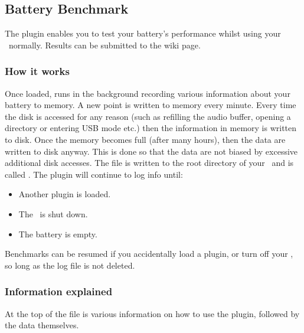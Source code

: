 \subsection{Battery Benchmark}
The  plugin enables you to test your battery's
performance whilst using your \dap\ normally. Results can be submitted 
to the  wiki page.

\subsubsection{How it works}
Once loaded,  runs in the
background recording various information about your battery to memory.
A new point is written to memory every minute.
Every time the disk is accessed for any reason
(such as refilling the audio buffer, opening a directory or entering
USB mode etc.) then the information in memory is written to disk.
Once the memory becomes full (after many hours), then the data
are written to disk anyway. This is done so that the data are not biased by
excessive additional disk accesses. The file is written to the root
directory of your \dap\ and is called .
The plugin will continue to log info until:

\begin{itemize}
\item Another plugin is loaded.
\item The \dap\ is shut down.
\item The battery is empty.
\end{itemize}

Benchmarks can be resumed if
you accidentally load a plugin, or turn off your \dap, so long as the log
file  is not deleted. 

\subsubsection{Information explained}
At the top of the  file is various
information on how to use the plugin, followed by the data themselves.

